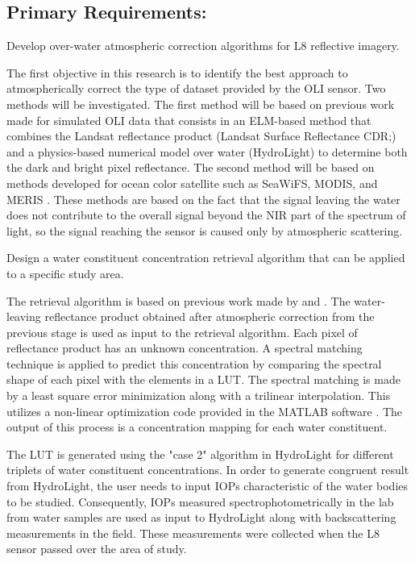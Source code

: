 \subsection{Primary Requirements:}
\begin{enumerate} 
	{\bf \item Develop over-water atmospheric correction algorithms for L8 reflective imagery.} 

The first objective in this research is to identify the best approach to atmospherically correct the type of dataset provided by the OLI sensor. Two methods will be investigated. The first method will be based on previous work made for simulated OLI data \cite{Gerace:2013,Gerace:2012,GeraceThesis,Pahlevan:2012} that consists in an ELM-based method that combines the Landsat reflectance product (Landsat Surface Reflectance CDR;\cite{LandsatCDR}) and a physics-based numerical model over water (HydroLight) to determine both the dark and bright pixel reflectance. The second method will be based on methods developed for ocean color satellite such as SeaWiFS, MODIS, and MERIS \cite{Gordon:1997}. These methods are based on the fact that the signal leaving the water does not contribute to the overall signal beyond the NIR part of the spectrum of light, so the signal reaching the sensor is caused only by atmospheric scattering.

	{\bf \item Design a water constituent concentration retrieval algorithm that can be applied to a specific study area.}

The retrieval algorithm is based on previous work made by \cite{Raqueno:2003} and \cite{GeraceThesis}. The water-leaving reflectance product obtained after atmospheric correction from the previous stage is used as input to the retrieval algorithm. Each pixel of reflectance product has an unknown concentration. A spectral matching technique is applied to predict this concentration by comparing the spectral shape of each pixel with the elements in a LUT. The spectral matching is made by a least square error minimization along with a trilinear interpolation. This utilizes a non-linear optimization code provided in the MATLAB software  . The output of this process is a concentration mapping for each water constituent.

The LUT is generated using the "case 2" { \color{red}  algorithm} in HydroLight for different triplets of water constituent concentrations. In order to generate congruent result from HydroLight, the user needs to input IOPs characteristic of the water bodies to be studied. Consequently, IOPs measured spectrophotometrically in the lab from water samples are used as input to HydroLight along with backscattering measurements in the field. These measurements were collected when the L8 sensor passed over the area of study.


\end{enumerate}
